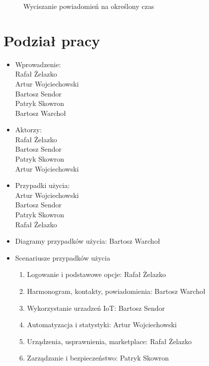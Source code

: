\documentclass{article}
\begin{document}
	\begin{figure}[H]
		\centering
		\noindent
		\captionsetup{labelformat=empty}
		\caption{Wyciszanie powiadomień na określony czas}
	\end{figure}

	\newpage
	\section{Podział pracy}

	\begin{itemize}
		\item Wprowadzenie: \\ Rafał Żelazko \\ Artur Wojciechowski \\ Bartosz
			Sendor \\ Patryk Skowron \\ Bartosz Warchoł \\

		\item Aktorzy:\\ Rafał Żelazko \\ Bartosz Sendor \\ Patryk Skowron \\ Artur Wojciechowski
			\\

		\item Przypadki użycia:\\ Artur Wojciechowski \\ Bartosz Sendor \\ Patryk Skowron
			\\ Rafał Żelazko \\

		\item Diagramy przypadków użycia: Bartosz Warchoł

		\item Scenariusze przypadków użycia

			\begin{enumerate}
				\item Logowanie i podstawowe opcje: Rafał Żelazko

				\item Harmonogram, kontakty, powiadomienia: Bartosz Warchoł

				\item Wykorzystanie urzadzeń IoT: Bartosz Sendor

				\item Automatyzacja i statystyki: Artur Wojciechowski

				\item Urządzenia, usprawnienia, marketplace: Rafał Żelazko

				\item Zarządzanie i bezpieczeństwo: Patryk Skowron
			\end{enumerate}
	\end{itemize}
\end{document}
